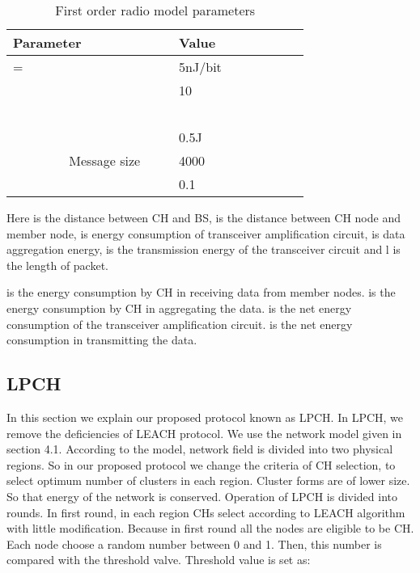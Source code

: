 \documentclass[journal]{IEEEtran}
\begin{document}
\begin{table}
\centering
\caption{First order radio model parameters}
\begin{tabular}{|l|l|}

\hline
Parameter        & Value            \\
\hline
= & 5nJ/bit          \\
\hline        
           & 10    \\
\hline        
          &  \\
\hline        
            & 0.5J             \\
\hline        
Message size     & 4000             \\
\hline        
          & 0.1              \\
\hline
\end{tabular}
\end{table}








Here  is the distance between CH and BS,  is the distance between CH node and member node,  is energy consumption of transceiver amplification circuit,  is data aggregation energy,  is the transmission energy of the transceiver circuit and l is the length of packet.

 is the energy consumption by CH in receiving data from member nodes.  is the energy consumption by CH in aggregating the data.  is the net energy consumption of the transceiver amplification circuit.  is the net energy consumption in transmitting the data.

\subsection{LPCH}
In this section we explain our proposed protocol known as LPCH. In LPCH, we remove the deficiencies of LEACH protocol. We use the network model given in section 4.1. According to the model, network field is divided into two physical regions. So in our proposed protocol we change the criteria of CH selection, to select optimum number of clusters in each region. Cluster forms are of lower size. So that energy of the network is conserved. Operation of LPCH is divided into rounds. In first round, in each region CHs select according to LEACH algorithm with little modification. Because in first round all the nodes are eligible to be CH. Each node choose a random number between 0 and 1. Then, this number is compared with the threshold valve. Threshold value is set as:
\end{document}
